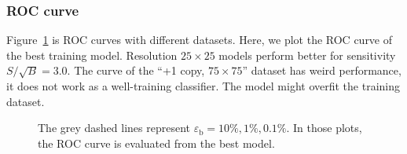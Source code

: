 \documentclass[12pt]{article}
\begin{document}
		\subsubsection{ROC curve}%
		\label{subs:roc_curve}
			Figure~\ref{fig:roc_curve_SB_3_5_7} is ROC curves with different datasets. Here, we plot the ROC curve of the best training model. Resolution $25\times 25$ models perform better for sensitivity $S / \sqrt{B} = 3.0$. The curve of the ``+1 copy, $75\times 75$'' dataset has weird performance, it does not work as a well-training classifier. The model might overfit the training dataset.
			\begin{figure}[htpb]
				\centering
				\caption{The grey dashed lines represent $\varepsilon_{\text{b}}=10 \%, 1 \%, 0.1\%$. In those plots, the ROC curve is evaluated from the best model.}
				\label{fig:roc_curve_SB_3_5_7}
			\end{figure}
\end{document}
